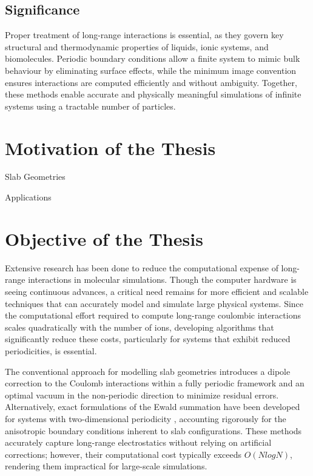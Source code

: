 \subsection{Significance}
Proper treatment of long-range interactions is essential, as they govern key structural and thermodynamic properties of liquids, ionic systems, and biomolecules. Periodic boundary conditions allow a finite system to mimic bulk behaviour by eliminating surface effects, while the minimum image convention ensures interactions are computed efficiently and without ambiguity. Together, these methods enable accurate and physically meaningful simulations of infinite systems using a tractable number of particles.
\section{Motivation of the Thesis} %
{Slab Geometries}

{Applications}



\section{Objective of the Thesis}
Extensive research has been done to reduce the computational expense of long-range interactions in molecular simulations. Though the computer hardware is seeing continuous advances, a critical need remains for more efficient and scalable techniques that can accurately model and simulate large physical systems. Since the computational effort required to compute long-range coulombic interactions scales quadratically with the number of ions, developing algorithms that significantly reduce these costs, particularly for systems that exhibit reduced periodicities, is essential. 

The conventional approach for modelling slab geometries introduces a dipole correction \cite{dipole-yeh-berkowitz} to the Coulomb interactions within a fully periodic framework and an optimal vacuum in the non-periodic direction to minimize residual errors. Alternatively, exact formulations of the Ewald summation have been developed for systems with two-dimensional periodicity \cite{kawata, PARRY1975433,de1979electrostatic, Heyes19771485}, accounting rigorously for the anisotropic boundary conditions inherent to slab configurations. These methods accurately capture long-range electrostatics without relying on artificial corrections; however, their computational cost typically exceeds $O(NlogN)$, rendering them impractical for large-scale simulations.

